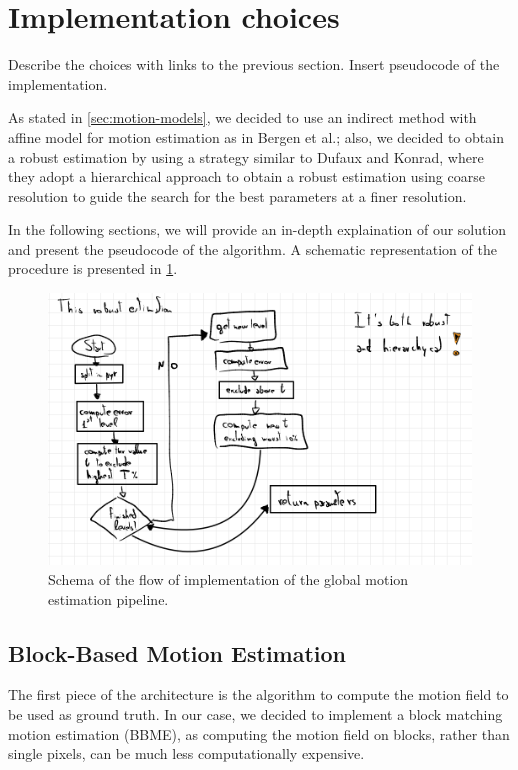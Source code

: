 \section{Implementation choices}
\label{sec:03-implementation}
Describe the choices with links to the previous section.
Insert pseudocode of the implementation.

As stated in \cref{sec:motion-models}, we decided to use an indirect method with affine model for motion estimation as in Bergen et al.\cite{Bergen92}; also, we decided to obtain a robust estimation by using a strategy similar to Dufaux and Konrad\cite{Dufeaux2000}, where they adopt a hierarchical approach to obtain a robust estimation using coarse resolution to guide the search for the best parameters at a finer resolution.

In the following sections, we will provide an in-depth explaination of our solution and present the pseudocode of the algorithm. A schematic representation of the procedure is presented in \cref{fig:gme-schema}.

\begin{figure}
    \centering
    \includegraphics[width=.95\linewidth]{../assets/images/gme-schema.png}
    \caption{Schema of the flow of implementation of the global motion estimation pipeline.}
    \label{fig:gme-schema}
\end{figure}

\subsection{Block-Based Motion Estimation}
\label{sec:BBME}
The first piece of the architecture is the algorithm to compute the motion field to be used as ground truth.
In our case, we decided to implement a block matching motion estimation (BBME), as computing the motion field on blocks, rather than single pixels, can be much less computationally expensive.

